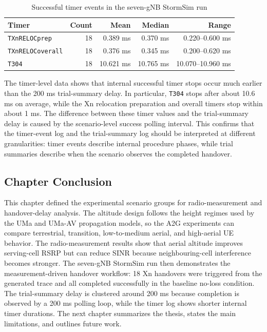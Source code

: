 \begin{table}[H]
\centering
\caption{Successful timer events in the seven-gNB StormSim run}
\begin{tabular}{lrrrr}
\toprule
Timer & Count & Mean & Median & Range\\
\midrule
\texttt{TXnRELOCprep} & 18 & 0.389 ms & 0.370 ms & 0.220--0.600 ms\\
\texttt{TXnRELOCoverall} & 18 & 0.376 ms & 0.345 ms & 0.200--0.620 ms\\
\texttt{T304} & 18 & 10.621 ms & 10.765 ms & 10.070--10.960 ms\\
\bottomrule
\end{tabular}
\label{tab:stormsim-seven-gnb-timers}
\end{table}

The timer-level data shows that internal successful timer stops occur much earlier than the 200 ms trial-summary delay. In particular, \texttt{T304} stops after about 10.6 ms on average, while the Xn relocation preparation and overall timers stop within about 1 ms. The difference between these timer values and the trial-summary delay is caused by the scenario-level success polling interval. This confirms that the timer-event log and the trial-summary log should be interpreted at different granularities: timer events describe internal procedure phases, while trial summaries describe when the scenario observes the completed handover.

\subsection{Chapter Conclusion}

This chapter defined the experimental scenario groups for radio-measurement and handover-delay analysis. The altitude design follows the height regimes used by the UMa and UMa-AV propagation models, so the A2G experiments can compare terrestrial, transition, low-to-medium aerial, and high-aerial UE behavior. The radio-measurement results show that aerial altitude improves serving-cell RSRP but can reduce SINR because neighbouring-cell interference becomes stronger. The seven-gNB StormSim run then demonstrates the measurement-driven handover workflow: 18 Xn handovers were triggered from the generated trace and all completed successfully in the baseline no-loss condition. The trial-summary delay is clustered around 200 ms because completion is observed by a 200 ms polling loop, while the timer log shows shorter internal timer durations. The next chapter summarizes the thesis, states the main limitations, and outlines future work.
